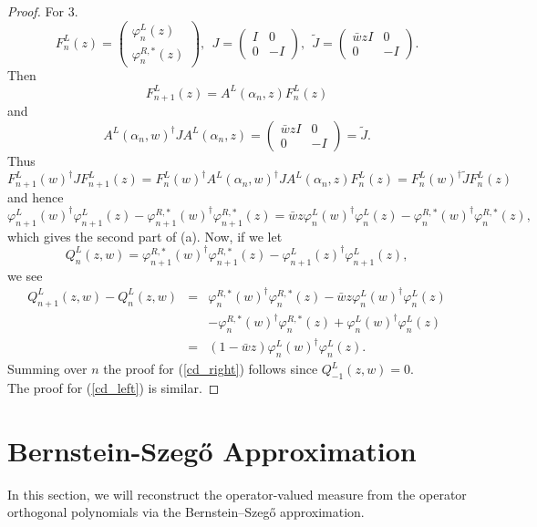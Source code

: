 \documentclass[11pt]{article}
\begin{document}
\begin{proof}
\noindent For 3.
$$
F_{n}^{L}(z)=\begin{pmatrix}
\varphi_{n}^{L}(z) \\
\varphi_{n}^{R,*}(z) 
\end{pmatrix}, ~~ 
J=\begin{pmatrix}
I & 0 \\
0 & -I
\end{pmatrix}, ~~
\tilde{J}=\begin{pmatrix}
\bar{w}zI & 0 \\
0 & -I
\end{pmatrix}.
$$
Then 
$$
F_{n+1}^{L}(z)= A^{L}(\alpha_{n},z)F_{n}^{L}(z)
$$ 
and 
$$
A^{L}(\alpha_{n},w)^{\dag} J A^{L}(\alpha_{n},z)=\begin{pmatrix}
\bar{w}zI & 0 \\
0 & -I
\end{pmatrix} = \tilde{J}.
$$ 
Thus 
$$
F_{n+1}^{L}(w)^{\dag} J F_{n+1}^{L}(z) = F_{n}^{L}(w)^{\dag} A^{L}(\alpha_{n},w)^{\dag} J A^{L}(\alpha_{n},z) F_{n}^{L}(z) = F_{n}^{L}(w)^{\dag} \tilde{J} F_{n}^{L}(z)
$$ 
and hence
$$
\varphi_{n+1}^{L}(w)^{\dag}\varphi_{n+1}^{L}(z) - \varphi_{n+1}^{R,*}(w)^{\dag}\varphi_{n+1}^{R,*}(z)=\bar{w}z\varphi_{n}^{L}(w)^{\dag}\varphi_{n}^{L}(z) - \varphi_{n}^{R,*}(w)^{\dag}\varphi_{n}^{R,*}(z),
$$ 
which gives the second part of (a). Now, if we let 
$$
Q_{n}^{L}(z,w)=\varphi_{n+1}^{R,*}(w)^{\dag}\varphi_{n+1}^{R,*}(z) - \varphi_{n+1}^{L}(z)^{\dag}\varphi_{n+1}^{L}(z),
$$ 
we see 
\begin{eqnarray*}
Q_{n+1}^{L}(z,w) - Q_{n}^{L}(z,w) &=& \varphi_{n}^{R,*}(w)^{\dag}\varphi_{n}^{R,*}(z) - \bar{w}z\varphi_{n}^{L}(w)^{\dag}\varphi_{n}^{L}(z) \\
& &- \varphi_{n}^{R,*}(w)^{\dag}\varphi_{n}^{R,*}(z) + \varphi_{n}^{L}(w)^{\dag}\varphi_{n}^{L}(z)\\
&=&(1-\bar{w}z)\varphi_{n}^{L}(w)^{\dag}\varphi_{n}^{L}(z).
\end{eqnarray*}
Summing over $n$ the proof for (\ref{cd_right}) follows since $Q_{-1}^{L}(z,w)=0$.\\
The proof for (\ref{cd_left}) is similar.
\end{proof}

\section{Bernstein-Szeg\H{o} Approximation}
In this section, we will reconstruct the operator-valued measure from the operator orthogonal polynomials via the Bernstein–Szeg\H{o} approximation.\\
\end{document}
